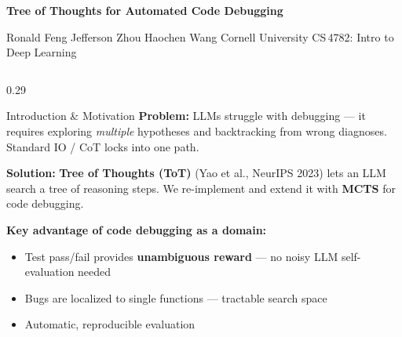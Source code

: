 \documentclass[final]{beamer}
\begin{document}
\begin{frame}[t]{}


\vspace{0.3cm}
\centering
{\fontsize{42}{50}\bfseries\color{white}\selectfont
  Tree of Thoughts for Automated Code Debugging\par}
\vspace{0.4cm}
{\fontsize{22}{28}\color{white}\selectfont
  Ronald Feng \quad Jefferson Zhou \quad Haochen Wang
  \quad\textbullet\quad Cornell University
  \quad\textbullet\quad CS\,4782: Intro to Deep Learning\par}
\vspace{0.5cm}

\begin{columns}[t,totalwidth=\textwidth]

\begin{column}{0.29\textwidth}

\begin{block}{Introduction \& Motivation}
\textbf{Problem:} LLMs struggle with debugging — it requires exploring \emph{multiple} hypotheses and backtracking from wrong diagnoses. Standard IO / CoT locks into one path.

\vspace{0.4cm}
\textbf{Solution:} \textbf{Tree of Thoughts (ToT)} (Yao et al., NeurIPS 2023) lets an LLM search a tree of reasoning steps. We re-implement and extend it with \textbf{MCTS} for code debugging.

\vspace{0.4cm}
\textbf{Key advantage of code debugging as a domain:}
\begin{itemize}
\setlength{\itemsep}{2pt}
  \item Test pass/fail provides \textbf{unambiguous reward} — no noisy LLM self-evaluation needed
  \item Bugs are localized to single functions — tractable search space
  \item Automatic, reproducible evaluation
\end{itemize}


\end{block}
\end{column}
\end{columns}
\end{frame}
\end{document}

